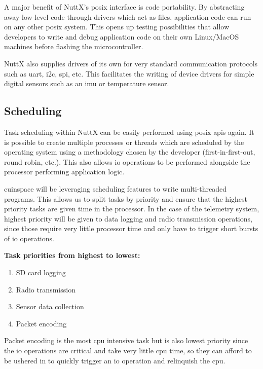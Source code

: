 A major benefit of NuttX's \gls{posix} interface is code portability. By abstracting away low-level code through
drivers which act as files, application code can run on any other \gls{posix} system. This opens up testing
possibilities that allow developers to write and debug application code on their own Linux/MacOS machines before
flashing the microcontroller.

NuttX also supplies drivers of its own for very standard communication protocols such as \gls{uart}, \gls{i2c},
\gls{spi}, etc. This facilitates the writing of device drivers for simple digital sensors such as an \gls{imu} or
temperature sensor.

\subsection{Scheduling}

Task scheduling within NuttX can be easily performed using \gls{posix} \glspl{api} again. It is possible to create
multiple processes or threads which are scheduled by the operating system using a methodology chosen by the developer
(first-in-first-out, round robin, etc.). This also allows \gls{io} operations to be performed alongside the processor
performing application logic.

\Gls{cuinspace} will be leveraging scheduling features to write multi-threaded programs. This allows us to split tasks
by priority and ensure that the highest priority tasks are given time in the processor. In the case of the telemetry
system, highest priority will be given to data logging and radio transmission operations, since those require very
little processor time and only have to trigger short bursts of \gls{io} operations.

\textbf{Task priorities from highest to lowest:}

\begin{enumerate}
    \item SD card logging
    \item Radio transmission
    \item Sensor data collection
    \item Packet encoding
\end{enumerate}

Packet encoding is the most \gls{cpu} intensive task but is also lowest priority since the \gls{io} operations are
critical and take very little \gls{cpu} time, so they can afford to be ushered in to quickly trigger an \gls{io}
operation and relinquish the \gls{cpu}.

